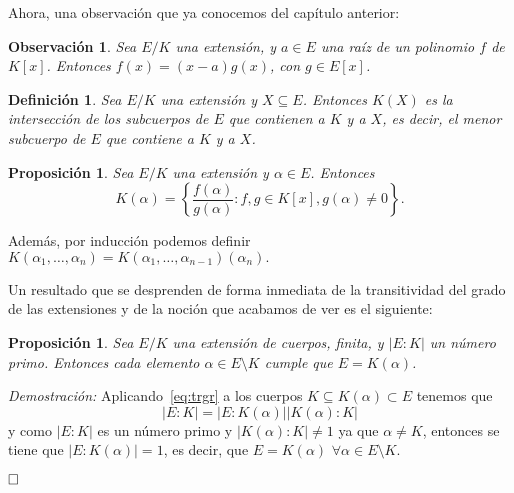 \documentclass[12pt]{article}
\newtheorem{proposition}[theorem]{Proposición}
\newtheorem{definition}[theorem]{Definición}
\newtheorem{observation}{Observación}[theorem]
\begin{document}
Ahora, una observación que ya conocemos del capítulo anterior:
\begin{observation} Sea $E/K$ una extensión, y $a \in E$ una raíz de un polinomio $f$ de $K[x]$. Entonces $f(x) = (x-a)g(x)$, con $g \in E[x]$.
\end{observation} 

\begin{definition} Sea $E/K$ una extensión y $X \subseteq E$. Entonces $K(X)$ es la intersección de los subcuerpos de $E$ que contienen a $K$ y a $X$, es decir, el menor subcuerpo de $E$ que contiene a $K$ y a $X$.
\end{definition}

\begin{proposition} \label{eq:kalfa} Sea $E/K$ una extensión y $\alpha \in E$. Entonces $$K (\alpha) = \left\lbrace \dfrac{f(\alpha)}{g(\alpha)} : f,g \in K[x], g(\alpha) \neq 0 \right\rbrace.$$
\end{proposition}

Además, por inducción podemos definir $K(\alpha_{1}, \ldots, \alpha_{n} ) = K(\alpha_{1}, \ldots, \alpha_{n-1})(\alpha_{n}).$

Un resultado que se desprenden de forma inmediata de la transitividad del grado de las extensiones y de la noción que acabamos de ver es el siguiente:
\begin{proposition} Sea $E/K$ una extensión de cuerpos, finita, y $|E:K|$ un número primo. Entonces cada elemento $\alpha \in E \setminus K$ cumple que $E = K(\alpha)$.
\end{proposition}
\emph{Demostración: } Aplicando~\ref{eq:trgr} a los cuerpos $K \subseteq K(\alpha) \subset E$ tenemos que $$|E:K| = |E: K(\alpha)| |K(\alpha) : K|$$ y como $|E:K|$ es un número primo y $|K(\alpha) :K| \neq 1$ ya que $\alpha \neq K$, entonces se tiene que $|E:K(\alpha)| = 1$, es decir, que $E = K(\alpha)$ $\forall \alpha \in E \setminus K$.

$\hfill \square$
\end{document}
